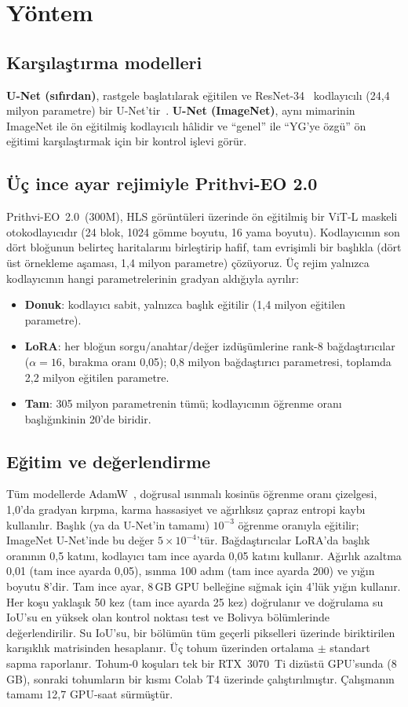 \documentclass[conference]{IEEEtran}
\begin{document}
\section{Yöntem}
\subsection{Karşılaştırma modelleri}
\textbf{U-Net (sıfırdan)}, rastgele başlatılarak eğitilen ve ResNet-34~\cite{he2016resnet} kodlayıcılı (24,4 milyon parametre) bir U-Net'tir~\cite{ronneberger2015unet}. \textbf{U-Net (ImageNet)}, aynı mimarinin ImageNet ile ön eğitilmiş kodlayıcılı hâlidir ve ``genel'' ile ``YG'ye özgü'' ön eğitimi karşılaştırmak için bir kontrol işlevi görür.

\subsection{Üç ince ayar rejimiyle Prithvi-EO 2.0}
Prithvi-EO~2.0~(300M), HLS görüntüleri üzerinde ön eğitilmiş bir ViT-L maskeli otokodlayıcıdır (24 blok, 1024 gömme boyutu, 16 yama boyutu). Kodlayıcının son dört bloğunun belirteç haritalarını birleştirip hafif, tam evrişimli bir başlıkla (dört üst örnekleme aşaması, 1,4 milyon parametre) çözüyoruz. Üç rejim yalnızca kodlayıcının hangi parametrelerinin gradyan aldığıyla ayrılır:
\begin{itemize}
  \item \textbf{Donuk}: kodlayıcı sabit, yalnızca başlık eğitilir (1,4 milyon eğitilen parametre).
  \item \textbf{LoRA}: her bloğun sorgu/anahtar/değer izdüşümlerine rank-8 bağdaştırıcılar ($\alpha=16$, bırakma oranı 0,05); 0,8 milyon bağdaştırıcı parametresi, toplamda 2,2 milyon eğitilen parametre.
  \item \textbf{Tam}: 305 milyon parametrenin tümü; kodlayıcının öğrenme oranı başlığınkinin 20'de biridir.
\end{itemize}

\subsection{Eğitim ve değerlendirme}
Tüm modellerde AdamW~\cite{loshchilov2019adamw}, doğrusal ısınmalı kosinüs öğrenme oranı çizelgesi, 1,0'da gradyan kırpma, karma hassasiyet ve ağırlıksız çapraz entropi kaybı kullanılır. Başlık (ya da U-Net'in tamamı) $10^{-3}$ öğrenme oranıyla eğitilir; ImageNet U-Net'inde bu değer $5\times10^{-4}$'tür. Bağdaştırıcılar LoRA'da başlık oranının 0,5 katını, kodlayıcı tam ince ayarda 0,05 katını kullanır. Ağırlık azaltma 0,01 (tam ince ayarda 0,05), ısınma 100 adım (tam ince ayarda 200) ve yığın boyutu 8'dir. Tam ince ayar, 8\,GB GPU belleğine sığmak için 4'lük yığın kullanır. Her koşu yaklaşık 50 kez (tam ince ayarda 25 kez) doğrulanır ve doğrulama su IoU'su en yüksek olan kontrol noktası test ve Bolivya bölümlerinde değerlendirilir. Su IoU'su, bir bölümün tüm geçerli pikselleri üzerinde biriktirilen karışıklık matrisinden hesaplanır. Üç tohum üzerinden ortalama $\pm$ standart sapma raporlanır. Tohum-0 koşuları tek bir RTX~3070~Ti dizüstü GPU'sunda (8\,GB), sonraki tohumların bir kısmı Colab T4 üzerinde çalıştırılmıştır. Çalışmanın tamamı 12,7 GPU-saat sürmüştür.
\end{document}
